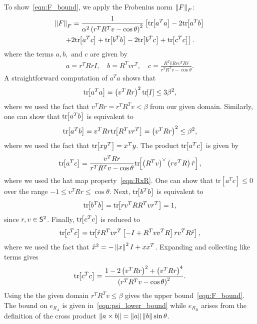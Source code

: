 \documentclass[letterpaper, 10 pt, conference]{ieeeconf}  %
\begin{document}
	To show~\cref{eqn:F_bound}, we apply the Frobenius norm \( \left\| F \right\|_F \):
	\begin{gather*}
		\left\| F \right\|_F = \frac{1}{\alpha ^2 \left( r^T R^T v - \cos \theta \right)^2} \left[\mathrm{tr}\negthickspace\left[ a^T a \right] - 2 \mathrm{tr}\negthickspace\left[ a^T b \right] \right. \\
		\left.+ 2 \mathrm{tr}\negthickspace\left[ a^T c  \right] + \mathrm{tr}\negthickspace\left[ b^T b \right]  - 2 \mathrm{tr}\negthickspace\left[ b^T c \right] + \mathrm{tr}\negthickspace\left[ c^T c \right]\right] .
	\end{gather*}
	where the terms \( a, b, \text{ and } c \) are given by
	\begin{gather*}
		a = r^T R r I , \quad	b = R^T v r^T , \quad c = \frac{R^T \hat{v} R r v^T R \hat{r}}{r^T R^T v - \cos \theta}.
	\end{gather*}
	A straightforward computation of \( a^T a \) shows that
	\begin{gather*}
		\mathrm{tr}\negthickspace\left[ a^T a \right] = \left( v^T R r \right)^2 \mathrm{tr}\negthickspace\left[ I \right] \leq 3 \beta^2 ,
	\end{gather*}
	where we used the fact that \( v^T R r = r^T R^T v < \beta \) from our given domain.
	Similarly, one can show that \( \mathrm{tr}\negthickspace\left[ a^T b \right] \) is equivalent to
	\begin{gather*}
		\mathrm{tr}\negthickspace\left[ a^T b \right] = v^T R r \mathrm{tr}\negthickspace\left[ R^T v r^T \right] = \left( v^T R r \right)^2 \leq \beta^2 ,
	\end{gather*} 
	where we used the fact that \( \mathrm{tr}\negthickspace\left[ x y^T \right] = x^T y \).
	The product \( \mathrm{tr}\negthickspace\left[ a^T c \right] \) is given by
	\begin{gather*}
		\mathrm{tr}\negthickspace\left[ a^T c \right] = \frac{v^T R r}{r^T R^T v - \cos \theta} \mathrm{tr}\negthickspace\left[ \left( R^T v \right)^\vee \left( r v^T R \right) \hat{r}  \right] ,
	\end{gather*}
	where we used the hat map property~\cref{eqn:RxR}.
	One can show that \(\mathrm{tr}[a^T c] \leq 0 \) over the range \( -1 \leq v^T R r \leq \cos \theta \). 
	Next, \( \mathrm{tr}\negthickspace\left[ b^T b \right]\) is equivalent to
	\begin{gather*}
		\mathrm{tr}\negthickspace\left[ b^T b \right] = \mathrm{tr}\negthickspace\left[ r v^T R R^T v r^T \right] = 1 ,
	\end{gather*}
	since \( r,v \in \mathsf{S}^2\).
	Finally, \( \mathrm{tr}\negthickspace\left[ c^T c \right] \) is reduced to
	\begin{gather*}
		\mathrm{tr}\negthickspace\left[ c^T c \right] = \mathrm{tr}\negthickspace\left[ \hat{r} R^T v r^T \left[ -I + R^T v v^T R \right] r v^T R \hat{r} \right] ,
	\end{gather*}
	where we used the fact that \( \hat{x}^2 = - \left\| x \right\|^2 I + x x^T\).
	Expanding and collecting like terms gives
	\begin{gather*}
		\mathrm{tr}\negthickspace\left[ c^T c  \right] = \frac{1 - 2\left( v^T R r \right)^2 + \left( v^T R r \right)^4}{\left( r^T R^T v - \cos \theta \right)^2} . 
	\end{gather*}
	Using the the given domain \( r^T R^T v \leq \beta \) gives the upper bound~\cref{eqn:F_bound}.
	The bound on \( e_{R_A} \) is given in~\cref{eqn:psi_lower_bound} while \( e_{R_B} \) arises from the definition of the cross product \( \left\| a \times b \right\| = \left\| a \right\| \left\| b \right\| \sin \theta \).
\end{document}
